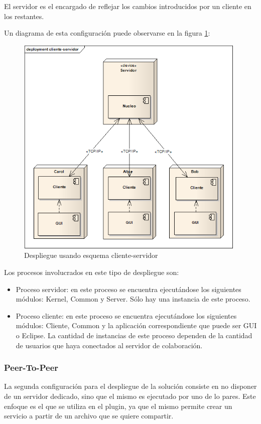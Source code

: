 \documentclass[12pt,a4paper]{article}
\begin{document}
El servidor es el encargado de reflejar los cambios introducidos por un cliente en los restantes.

Un diagrama de esta configuración puede observarse en la figura \ref{cliente-servidor}:

	\begin{figure}[!ht]
		\begin{center}
			\includegraphics[width=11cm]{cliente-servidor.png}
			\caption{\label{cliente-servidor} Despliegue usando esquema cliente-servidor }
		\end{center}
	\end{figure}

Los procesos involucrados en este tipo de despliegue son:

\begin{itemize}
	\item Proceso servidor: en este proceso se encuentra ejecutándose los siguientes módulos: Kernel, Common y Server. Sólo
	hay una instancia de este proceso.
	\item Proceso cliente: en este proceso se encuentra ejecutándose los siguientes módulos: Cliente, Common y la aplicación
	correspondiente que puede ser GUI o Eclipse. La cantidad de instancias de este proceso dependen de la cantidad de usuarios que
	haya conectados al servidor de colaboración.
\end{itemize}

\subsubsection{Peer-To-Peer}
La segunda configuración para el despliegue de la solución consiste en no disponer de un servidor dedicado, sino que el
mismo es ejecutado por uno de lo pares. Este enfoque es el que se utiliza en el plugin, ya que el mismo permite crear un servicio
a partir de un archivo que se quiere compartir.
\end{document}
